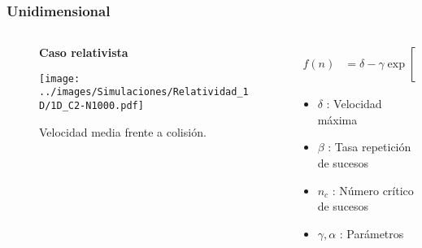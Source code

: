 \documentclass{beamer}
\begin{document}
\begin{frame}[t]
    \frametitle[prueb1]{Unidimensional}
    \begin{columns}
        \hspace{-0.0cm}
        \begin{column}{0.5\textwidth}
            \vspace{0.5cm}
            \begin{figure}
                \centering
                \hspace{.5cm}
                \textbf{Caso relativista}\par\medskip
                \texttt{[image: ../images/Simulaciones/Relatividad\_1D/1D\_C2-N1000.pdf]}
                \caption{Velocidad media frente a colisión.}
            \end{figure}         
        \end{column}
        \begin{column}{0.5\textwidth}
            \begin{align*}
                f(n) &= \delta - \gamma \exp\left[ -\beta \left( \dfrac{n}{n_c} \right)^\alpha \right]
            \end{align*}
            \begin{itemize}
                \item \( \delta \) : Velocidad máxima 
                \item \( \beta \) : Tasa repetición de sucesos
                \item \( n_c \) : Número crítico de sucesos
                \item \( \gamma, \alpha \) : Parámetros
            \end{itemize}
        \end{column}
    \end{columns}
\end{frame}
\end{document}
